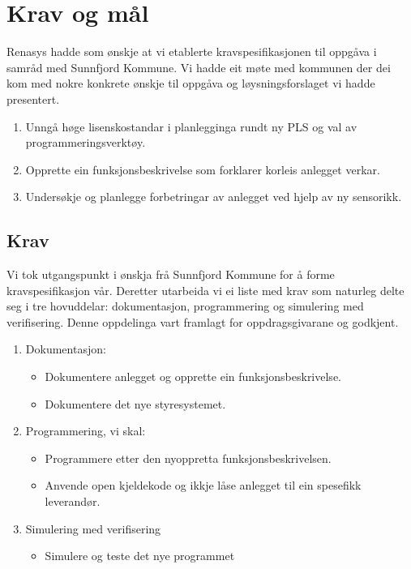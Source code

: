 \chapter{Krav og mål}
\thispagestyle{fancy}
\label{sec: 5}

\gls{Renasys} hadde som ønskje at vi etablerte kravspesifikasjonen til oppgåva 
i samråd med \gls{Sunnfjord Kommune}.\newline
Vi hadde eit møte med kommunen der dei kom med nokre konkrete ønskje til oppgåva
og løysningsforslaget vi hadde presentert.

\begin{enumerate}
    \item Unngå høge lisenskostandar i planlegginga rundt ny PLS og val av programmeringsverktøy.
    \item Opprette ein funksjonsbeskrivelse som forklarer korleis anlegget verkar.
    \item Undersøkje og planlegge forbetringar av anlegget ved hjelp av ny sensorikk.
\end{enumerate}

\section{Krav}
Vi tok utgangspunkt i ønskja frå \gls{Sunnfjord Kommune} for å forme kravspesifikasjon vår.
Deretter utarbeida vi ei liste med krav som naturleg delte seg i tre
hovuddelar: dokumentasjon, programmering og simulering med verifisering. 
Denne oppdelinga vart framlagt for oppdragsgivarane og godkjent. 

\begin{enumerate}
    \item Dokumentasjon:
    \begin{itemize}
        \item Dokumentere anlegget og opprette ein funksjonsbeskrivelse.
        \item Dokumentere det nye styresystemet.
    \end{itemize}
    \item Programmering, vi skal:
    \begin{itemize}
        \item Programmere etter den nyoppretta funksjonsbeskrivelsen.
        \item Anvende open kjeldekode og ikkje låse anlegget til ein spesefikk leverandør.
    \end{itemize}
    \item Simulering med verifisering
    \begin{itemize}
        \item Simulere og teste det nye programmet
    \end{itemize}
\end{enumerate}


